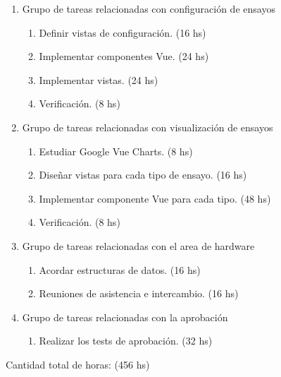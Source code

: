 \documentclass[11pt]{charter}
\begin{document}
\begin{enumerate}
\item Grupo de tareas relacionadas con configuración de ensayos
	\begin{enumerate}
	\item Definir vistas de configuración. (16 hs)
	\item Implementar componentes Vue. (24 hs)
	\item Implementar vistas. (24 hs)
	\item Verificación. (8 hs)
	\end{enumerate}

\item Grupo de tareas relacionadas con visualización de ensayos
	\begin{enumerate}
	\item Estudiar Google Vue Charts. (8 hs)
	\item Diseñar vistas para cada tipo de ensayo. (16 hs)
	\item Implementar componente Vue para cada tipo. (48 hs)
	\item Verificación. (8 hs)
	\end{enumerate}

\item Grupo de tareas relacionadas con el area de hardware
	\begin{enumerate}
	\item Acordar estructuras de datos. (16 hs)
	\item Reuniones de asistencia e intercambio. (16 hs)
	\end{enumerate}

\item Grupo de tareas relacionadas con la aprobación
	\begin{enumerate}
	\item Realizar los tests de aprobación. (32 hs)
	\end{enumerate}

\end{enumerate}

Cantidad total de horas: (456 hs)
\end{document}
